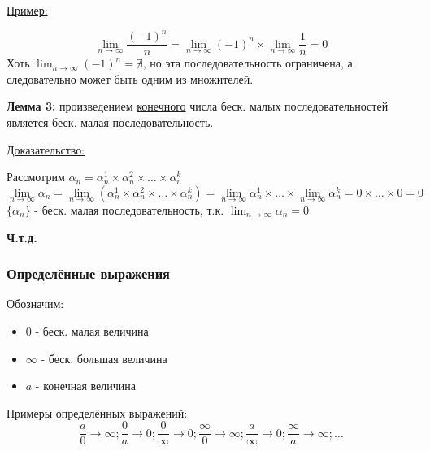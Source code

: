 \documentclass[12pt]{article}
\begin{document}
    \underline{Пример:}
    \begin{adjustwidth}{1.5em}{1.5em}
        \[ \lim_{n\to\infty} \frac{(-1)^n}{n} = \lim_{n\to\infty}(-1)^n \times \lim_{n\to\infty}\frac{1}{n} = 0 \]
        Хоть $\lim_{n\to\infty} (-1)^n = \nexists$, но эта последовательность ограничена, а следовательно может быть одним из множителей.
    \end{adjustwidth}

    \noindent\textbf{Лемма 3:} произведением \underline{конечного} числа беск. малых последовательностей является беск. малая последовательность.\par\noindent
    \underline{Доказательство:}\par
    \begin{adjustwidth}{1.5em}{1.5em}
        Рассмотрим $\alpha_n = \alpha_n^1 \times \alpha_n^2 \times \dots \times \alpha_n^k$\\
        \[ \lim_{n\to\infty} \alpha_n = \lim_{n\to\infty}(\alpha_n^1 \times \alpha_n^2 \times \dots \times \alpha_n^k) = \lim_{n\to\infty}\alpha_n^1 \times \dots \times \lim_{n\to\infty}\alpha_n^k = 0 \times \dots \times 0 = 0 \]
        $\{\alpha_n\}$ - беск. малая последовательность, т.к. $\lim_{n\to\infty}\alpha_n = 0$
        \begin{center}
            \textbf{Ч.т.д.}
        \end{center}
    \end{adjustwidth}

    \subsubsection*{Определённые выражения}
    \noindent Обозначим:
    \begin{itemize}
        \item $0$ - беск. малая величина
        \item $\infty$ - беск. большая величина
        \item $a$ - конечная величина
    \end{itemize}
    Примеры определённых выражений:
    \[ 
        \frac{a}{0} \to \infty; \frac{0}{a} \to 0; \frac{0}{\infty} \to 0; \frac{\infty}{0} \to \infty; \frac{a}{\infty} \to 0; \frac{\infty}{a} \to \infty; \dots
    \]
\end{document}
